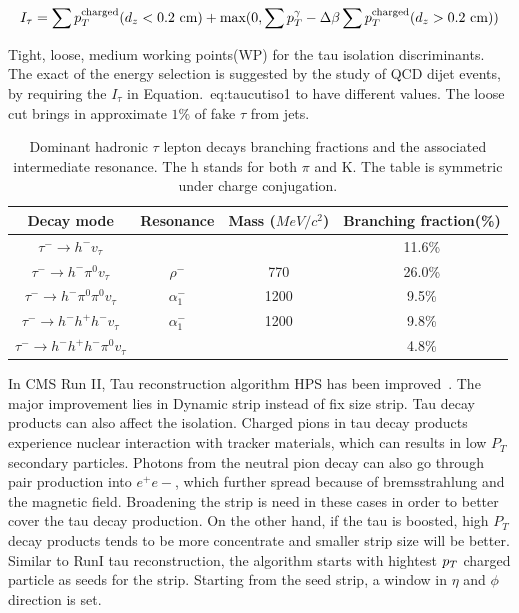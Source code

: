 \begin{align}
I_{\tau}=\sum \pt^{\text{charged}} (d_{z}<0.2 \ \text{cm})+\text{max}(0,\sum \pt^{\gamma}-\Delta \beta \sum \pt^{\text{charged}} (d_{z}>0.2 \ \text{cm}))\label{eq:taucutiso1}
\end{align}

Tight, loose, medium working points(WP) for the tau isolation discriminants. The exact of the energy selection is suggested by the study of QCD dijet events, by requiring the $I_{\tau}$ in Equation.~{eq:taucutiso1} to have different values. The loose cut brings in approximate $1\%$ of fake $\tau$ from jets. 


\begin{table}[htp]
\caption{Dominant hadronic $\tau$ lepton decays branching fractions and the associated intermediate resonance. The h stands for both $\pi$ and K. The table is symmetric under charge conjugation.}\label{tb:tauHdecay}
\begin{center}
\begin{tabular}{|c|c|c|c|}
\hline
Decay mode                                             & Resonance & Mass ($MeV/c^{2}$) & Branching fraction(\%)\\\hline
$\tau^{-}\to h^{-}v_{\tau}$                                     &                                  &           &  11.6\%     \\
$\tau^{-}\to h^{-}\pi^{0} v_{\tau}$                       & $\rho^{-}$                 & 770     &   26.0\%      \\
$\tau^{-}\to h^{-}\pi^{0} \pi^{0}  v_{\tau}$       & $\alpha_{1}^{-}$       & 1200   &   9.5\%     \\
$\tau^{-}\to h^{-}h^{+}h^{-}v_{\tau}$                     & $\alpha_{1}^{-}$       &  1200  &   9.8\%  \\
$\tau^{-}\to h^{-}h^{+}h^{-}\pi^{0} v_{\tau}$      &                                  &            &   4.8\% \\\hline
 \end{tabular}
\end{center}
\end{table}


In CMS Run II, Tau reconstruction algorithm HPS has been improved~\cite{TauRecoandIDRunII}. The major improvement lies in Dynamic strip instead of fix size strip. Tau decay products can also affect the isolation. Charged pions in tau decay products experience nuclear interaction with tracker materials, which can results in low $P_{T}$ secondary particles. Photons from the neutral pion decay can also go through pair production into $e^{+}e{-}$, which further spread because of bremsstrahlung and the magnetic field. Broadening the strip is need in these cases in order to better cover the tau decay production. On the other hand, if the tau is boosted, high $P_{T}$ decay products tends to be more concentrate and smaller strip size will be better. Similar to RunI tau reconstruction, the algorithm starts with hightest $p_{T}$ charged particle as seeds for the strip. Starting from the seed strip, a window in $\eta$ and $\phi$ direction is set.  

